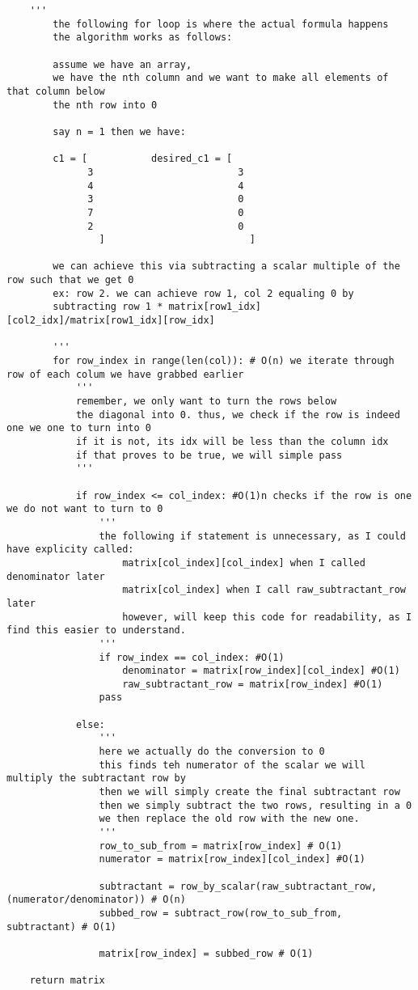 \documentclass[12pt, a4paper]{article}
\begin{document}
\begin{lstlisting}
    '''
        the following for loop is where the actual formula happens
        the algorithm works as follows:

        assume we have an array, 
        we have the nth column and we want to make all elements of that column below 
        the nth row into 0

        say n = 1 then we have:

        c1 = [           desired_c1 = [
              3                         3
              4                         4
              3                         0
              7                         0
              2                         0
                ]                         ]
        
        we can achieve this via subtracting a scalar multiple of the row such that we get 0
        ex: row 2. we can achieve row 1, col 2 equaling 0 by 
        subtracting row 1 * matrix[row1_idx][col2_idx]/matrix[row1_idx][row_idx]
        
        '''
        for row_index in range(len(col)): # O(n) we iterate through row of each colum we have grabbed earlier
            '''
            remember, we only want to turn the rows below
            the diagonal into 0. thus, we check if the row is indeed one we one to turn into 0
            if it is not, its idx will be less than the column idx
            if that proves to be true, we will simple pass
            '''

            if row_index <= col_index: #O(1)n checks if the row is one we do not want to turn to 0
                '''
                the following if statement is unnecessary, as I could have explicity called:
                    matrix[col_index][col_index] when I called denominator later
                    matrix[col_index] when I call raw_subtractant_row later
                    however, will keep this code for readability, as I find this easier to understand.
                '''
                if row_index == col_index: #O(1)
                    denominator = matrix[row_index][col_index] #O(1)
                    raw_subtractant_row = matrix[row_index] #O(1)
                pass              

            else:
                '''
                here we actually do the conversion to 0
                this finds teh numerator of the scalar we will multiply the subtractant row by
                then we will simply create the final subtractant row
                then we simply subtract the two rows, resulting in a 0
                we then replace the old row with the new one.                
                '''
                row_to_sub_from = matrix[row_index] # O(1)
                numerator = matrix[row_index][col_index] #O(1)

                subtractant = row_by_scalar(raw_subtractant_row, (numerator/denominator)) # O(n)
                subbed_row = subtract_row(row_to_sub_from, subtractant) # O(1)

                matrix[row_index] = subbed_row # O(1)
    
    return matrix

\end{lstlisting}
\end{document}
